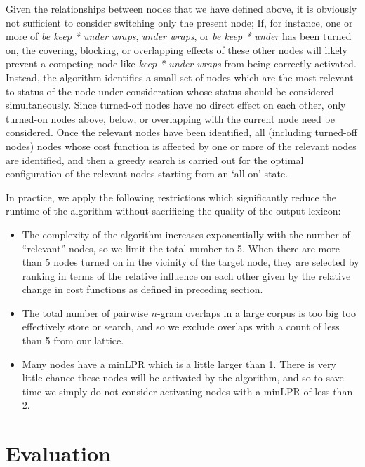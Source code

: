 \documentclass[11pt]{article}
\begin{document}

Given the relationships between nodes that we have defined above, it is obviously not sufficient to consider switching only the present node; If, for instance, one or more of \emph{be keep * under wraps}, \emph{under wraps}, or \emph{be keep * under} has been turned on, the covering, blocking, or overlapping effects of these other nodes will likely prevent a competing node like \emph{keep * under wraps} from being correctly activated. Instead, the algorithm identifies a small set of nodes which are the most relevant to status of the node under consideration whose status should be considered simultaneously. Since turned-off nodes have no direct effect on each other, only turned-on nodes above, below, or overlapping with the current node need be considered.  Once the relevant nodes have been identified, all (including turned-off nodes) nodes whose cost function is affected by one or more of the relevant nodes are identified, and then a greedy search is carried out for the optimal configuration of the relevant nodes starting from an `all-on' state. 

In practice, we apply the following restrictions which significantly reduce the runtime of the algorithm without sacrificing the quality of the output lexicon:

\begin{itemize}
\item The complexity of the algorithm increases exponentially with the number of ``relevant'' nodes, so we limit the total number to 5. When there are more than 5 nodes turned on in the vicinity of the target node, they are selected by ranking in terms of the relative influence on each other given by the relative change in cost functions as defined in preceding section.
\item The total number of pairwise $n$-gram overlaps in a large corpus is too big too effectively store or search, and so we exclude overlaps with a count of less than 5 from our lattice.
\item Many nodes have a minLPR which is a little larger than 1. There is very little chance these nodes will be activated by the algorithm, and so to save time we simply do not consider activating nodes with a minLPR of less than 2.
\end{itemize}

\section{Evaluation}
\end{document}
